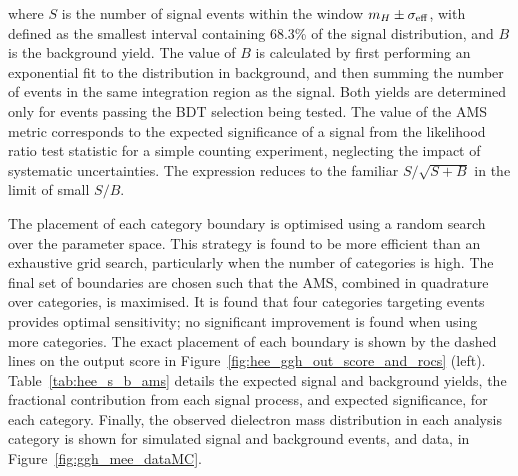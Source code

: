 \noindent where $S$ is the number of signal events within the window $m_{H}\pm\sigma_{\text{eff}}$, with \seff defined as the smallest interval containing 68.3\% of the signal distribution, and $B$ is the background yield. The value of $B$ is calculated by first performing an exponential fit to the \mee distribution in background, and then summing the number of events in the same integration region as the signal. Both yields are determined only for events passing the BDT selection being tested. The value of the AMS metric corresponds to the expected significance of a signal from the likelihood ratio test statistic for a simple counting experiment, neglecting the impact of systematic uncertainties. The expression reduces to the familiar $S/\sqrt{S+B}$ in the limit of small $S/B$.  

The placement of each category boundary is optimised using a random search over the parameter space. This strategy is found to be more efficient than an exhaustive grid search, particularly when the number of categories is high.
The final set of boundaries are chosen such that the AMS, combined in quadrature over categories, is maximised. 
It is found that four categories targeting \ggH events provides optimal sensitivity; no significant improvement is found when using more categories. The exact placement of each boundary is shown by the dashed lines on the output score in Figure~\ref{fig:hee_ggh_out_score_and_rocs} (left). Table~\ref{tab:hee_s_b_ams} details the expected signal and background yields, the fractional contribution from each signal process, and expected significance, for each \ggH category. Finally, the observed dielectron mass distribution in each \ggH analysis category is shown for simulated \ggH signal and background events, and data, in Figure~\ref{fig:ggh_mee_dataMC}.

